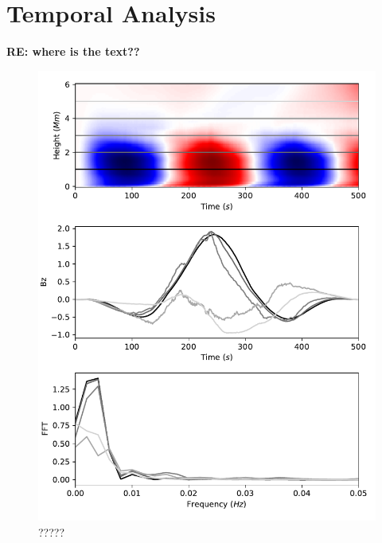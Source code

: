 \documentclass{aastex62}
\begin{document}


\section{Temporal Analysis}

\noindent
{\bf RE: where is the text??}


\begin{figure}
    \label{fft_sim}
    \includegraphics[scale=0.6]{imrescale/fft_sim.pdf}
    \caption{?????}
\end{figure}
\end{document}
